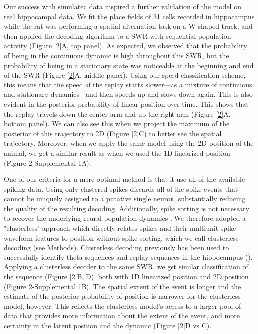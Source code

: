 \documentclass[times, twoside]{zHenriquesLab-StyleBioRxiv}
\begin{document}
Our success with simulated data inspired a further validation of the model on real hippocampal data. We fit the place fields of 31 cells recorded in hippocampus while the rat was performing a spatial alternation task on a W-shaped track, and then applied the decoding algorithm to a SWR with sequential population activity (Figure \ref{2}A, top panel). As expected, we observed that the probability of being in the continuous dynamic is high throughout this SWR, but the probability of being in a stationary state was noticeable at the beginning and end of the SWR (Figure \ref{2}A, middle panel). Using our speed classification scheme, this means that the speed of the replay starts slower---as a mixture of continuous and stationary dynamics---and then speeds up and slows down again. This is also evident in the posterior probability of linear position over time. This shows that the replay travels down the center arm and up the right arm (Figure \ref{2}A, bottom panel). We can also see this when we project the maximum of the posterior of this trajectory to 2D (Figure \ref{2}C) to better see the spatial trajectory. Moreover, when we apply the same model using the 2D position of the animal, we get a similar result as when we used the 1D linearized position (Figure 2-Supplemental 1A).

One of our criteria for a more optimal method is that it use all of the available spiking data. Using only clustered spikes discards all of the spike events that cannot be uniquely assigned to a putative single neuron, substantially reducing the quality of the resulting decoding. Additionally, spike sorting is not necessary to recover the underlying neural population dynamics \cite{TrautmannAccurateEstimationNeural2019}. We therefore adopted a "clusterless" approach which directly relates spikes and their multiunit spike waveform features to position without spike sorting, which we call clusterless decoding (see Methods). Clusterless decoding previously has been used to successfully identify theta sequences and replay sequences in the hippocampus (\cite{KloostermanBayesiandecodingusing2014, ChenTransductiveneuraldecoding2012,DengRapidclassificationhippocampal2016, KayConstantSubsecondCycling2020}). Applying a clusterless decoder to the same SWR, we get similar classification of the sequence (Figure \ref{2}B, D), both with 1D linearized position and 2D position (Figure 2-Supplemental 1B). The spatial extent of the event is longer and the estimate of the posterior probability of position is narrower for the clusterless model, however. This reflects the clusterless model's access to a larger pool of data that provides more information about the extent of the event, and more certainty in the latent position and the dynamic (Figure \ref{2}D vs C).
\end{document}
